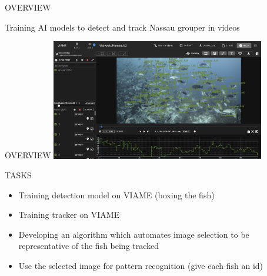 
\begin{frame}{OVERVIEW}

   Training AI models to detect and track Nassau grouper in videos
\end{frame}


\begin{frame}{OVERVIEW}
    \centering
     \includegraphics[height=0.7\textheight,width=0.7\textwidth,keepaspectratio]{images/gm1.png}
     
\end{frame}

\begin{frame}{TASKS}
    \begin{itemize}
        \item Training detection model on VIAME (boxing the fish)
        \item Training tracker on VIAME 
        \item Developing an algorithm which automates image selection to be representative of the fish being tracked
        \item Use the selected image for pattern recognition (give each fish an id)
    \end{itemize}
\end{frame}



